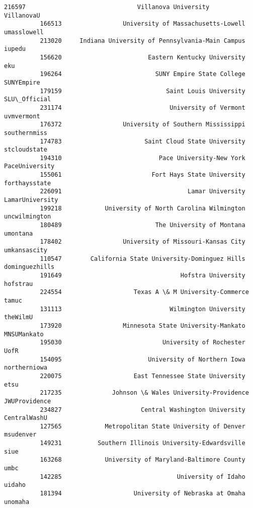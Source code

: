 \documentclass[11pt]{article}
\begin{document}
\begin{Verbatim}[commandchars=\\\{\}]
          216597                               Villanova University       VillanovaU   
          166513                 University of Massachusetts-Lowell      umasslowell   
          213020     Indiana University of Pennsylvania-Main Campus           iupedu   
          156620                        Eastern Kentucky University              eku   
          196264                          SUNY Empire State College       SUNYEmpire   
          179159                             Saint Louis University     SLU\_Official   
          231174                              University of Vermont       uvmvermont   
          176372                 University of Southern Mississippi     southernmiss   
          174783                       Saint Cloud State University     stcloudstate   
          194310                           Pace University-New York   PaceUniversity   
          155061                         Fort Hays State University    forthaysstate   
          226091                                   Lamar University  LamarUniversity   
          199218            University of North Carolina Wilmington    uncwilmington   
          180489                          The University of Montana         umontana   
          178402                 University of Missouri-Kansas City     umkansascity   
          110547        California State University-Dominguez Hills   dominguezhills   
          191649                                 Hofstra University         hofstrau   
          224554                    Texas A \& M University-Commerce            tamuc   
          131113                              Wilmington University         theWilmU   
          173920                 Minnesota State University-Mankato      MNSUMankato   
          195030                            University of Rochester             UofR   
          154095                        University of Northern Iowa     northerniowa   
          220075                    East Tennessee State University             etsu   
          217235              Johnson \& Wales University-Providence    JWUProvidence   
          234827                      Central Washington University     CentralWashU   
          127565            Metropolitan State University of Denver        msudenver   
          149231          Southern Illinois University-Edwardsville             siue   
          163268            University of Maryland-Baltimore County             umbc   
          142285                                University of Idaho           uidaho   
          181394                    University of Nebraska at Omaha          unomaha   

\end{Verbatim}
\end{document}
